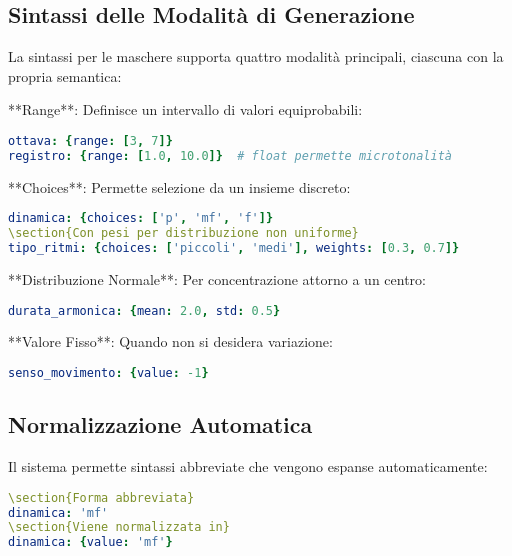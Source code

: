 \subsection{Sintassi delle Modalità di Generazione}
La sintassi per le maschere supporta quattro modalità principali, ciascuna con la propria semantica:

**Range**: Definisce un intervallo di valori equiprobabili:
\begin{lstlisting}[language=Yaml]
ottava: {range: [3, 7]}
registro: {range: [1.0, 10.0]}  # float permette microtonalità
\end{lstlisting}

**Choices**: Permette selezione da un insieme discreto:
\begin{lstlisting}[language=Yaml]
dinamica: {choices: ['p', 'mf', 'f']}
\section{Con pesi per distribuzione non uniforme}
tipo_ritmi: {choices: ['piccoli', 'medi'], weights: [0.3, 0.7]}
\end{lstlisting}

**Distribuzione Normale**: Per concentrazione attorno a un centro:
\begin{lstlisting}[language=Yaml]
durata_armonica: {mean: 2.0, std: 0.5}
\end{lstlisting}

**Valore Fisso**: Quando non si desidera variazione:
\begin{lstlisting}[language=Yaml]
senso_movimento: {value: -1}
\end{lstlisting}
\subsection{Normalizzazione Automatica}
Il sistema permette sintassi abbreviate che vengono espanse automaticamente:

\begin{lstlisting}[language=Yaml]
\section{Forma abbreviata}
dinamica: 'mf'
\section{Viene normalizzata in}
dinamica: {value: 'mf'}
\end{lstlisting}

